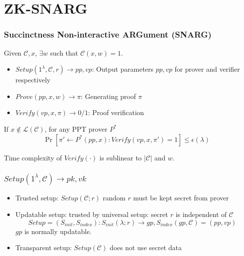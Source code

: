 \documentclass[UFT8]{beamer}
\begin{document}
\section{{ZK-SNARG}}

\begin{frame}
    \frametitle{Succinctness Non-interactive ARGument (SNARG)}
    Given $\mathcal{C}, x$, $\exists w$ such that $\mathcal{C}(x, w) = 1$.
    \begin{itemize}
        \item $Setup(1^\lambda, \mathcal{C}, r) \rightarrow pp, vp$: Output parameters $pp, vp$ for prover and verifier respectively
        \item $Prove(pp, x, w) \rightarrow \pi$: Generating proof $\pi$
        \item $Verify(vp, x, \pi) \rightarrow 0/1$: Proof verification
    \end{itemize}
    \begin{definition}[Soundness]
        If $x \notin \mathcal{L}(\mathcal{C})$, for any PPT prover $P^*$
        \begin{equation*}
            \Pr[\pi' \leftarrow P^*(pp, x): Verify(vp, x, \pi') = 1] \le \epsilon(\lambda)
        \end{equation*}
    \end{definition}

    \begin{definition}[Succinctness]
       Time complexity of $Verify(\cdot)$ is sublinear to $|\mathcal{C}|$ and $w$.
    \end{definition}

\end{frame}

\begin{frame}
    \frametitle{$Setup(1^\lambda, \mathcal{C}) \rightarrow pk, vk$}
    \begin{itemize}
        \item Trusted setup: $Setup(\mathcal{C}; r)$ random $r$ must be kept secret from prover
        \item Updatable setup: trusted by universal setup: secret $r$ is independent of $\mathcal{C}$
        \begin{equation*}
            Setup = (S_{init}, S_{index}): S_{init}(\lambda; r) \rightarrow gp, S_{index}(gp, \mathcal{C}) = (pp, vp)
        \end{equation*}
        $gp$ is normally updatable.
        \item Transparent setup: $Setup(\mathcal{C})$ does not use secret data
    \end{itemize}

\end{frame}
\end{document}
